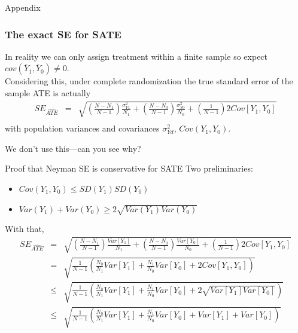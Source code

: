 \documentclass[xcolor=dvipsnames]{beamer}
\begin{document}

\appendix

\begin{frame}
\begin{center}
\Large Appendix
\end{center}
\end{frame}



\begin{frame}
\frametitle{The exact SE for SATE}
\small
{} In reality we can only assign treatment within a finite sample so expect $cov(\overline{Y}_1,\overline{Y}_0) \neq 0$.\\

\medskip
{} Considering this, under complete randomization the true standard error of the sample ATE is actually
\pause
\footnotesize
 \begin{eqnarray*}
 SE_{\widehat{ATE}}&=&\sqrt{ \left( \frac{N-N_1}{N-1}\right) \frac{\sigma^2_{Y1}}{N_1}+ \left( \frac{N-N_0}{N-1}\right) \frac{\sigma^2_{Y0}}{N_0} + \left(\frac{1}{N-1} \right) 2Cov[Y_{1},Y_{0}]} \\
\end{eqnarray*}
\vspace{-.1in}
\small
with population variances and covariances $\sigma^2_{Yd}$, $Cov(Y_{1},Y_{0})$.\\
\bigskip

 We don't use this---can you see why?
\end{frame}


\begin{frame}{Proof that Neyman SE is conservative for SATE}
\small
Two preliminaries:
\footnotesize
\begin{itemize}
\item $Cov(Y_1,Y_0) \leq SD(Y_1)SD(Y_0)$
\item $Var(Y_1) + Var(Y_0) \geq 2\sqrt{Var(Y_1) Var(Y_0)}$
\end{itemize}
\small
{} With that,
\scriptsize
\begin{eqnarray*}
  SE_{\widehat{ATE}}  & = & \sqrt{ \left( \frac{N-N_1}{N-1}\right) \frac{Var[Y_{1}]}{N_1}+ \left( \frac{N-N_0}{N-1}\right) \frac{Var[Y_{0}]}{N_0} + \left(\frac{1}{N-1} \right) 2Cov[Y_{1},Y_{0}]} \\
 & = & \sqrt{ \frac{1}{N-1} \left(\frac{N_0}{N_1}Var[Y_1]+\frac{N_1}{N_0}Var[Y_0]+2Cov[Y_1,Y_0]\right)}  \\
                      & \leq & \sqrt{\frac{1}{N-1}\left( \frac{N_0}{N_1}Var[Y_1]+\frac{N_1}{N_0}Var[Y_0] +2\sqrt{Var[Y_1]Var[Y_0]}\right)} \\
                     & \leq & \sqrt{\frac{1}{N-1}\left( \frac{N_0}{N_1}Var[Y_1]+\frac{N_1}{N_0}Var[Y_0]  + Var[Y_1]+Var[Y_0]\right)} \\
\end{eqnarray*}
\end{frame}
\end{document}
